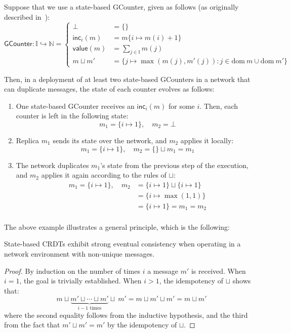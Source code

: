 \begin{example}
  Suppose that we use a state-based GCounter, given as follows (as originally
  described in~\citep{almedia18}):
  \[
    \mathsf{GCounter}
      : \mathbb{I} \hookrightarrow \mathbb{N}
      = \left\{
          \begin{aligned}
            \bot &= \{\} \\
            \mathsf{inc}_i(m) &= m\{ i \mapsto m(i) + 1 \} \\
            \mathsf{value}(m) &= \sum_{j \in \mathbb{I}} m(j) \\
            m \sqcup m' &= \{
              j \mapsto \max(m(j), m'(j)) :
              j \in \mathrm{dom}~m \cup \mathrm{dom}~m'
            \}
          \end{aligned}
        \right.
  \]

  Then, in a deployment of at least two state-based GCounters in a network that
  can duplicate messages, the state of each counter evolves as follows:
  \begin{enumerate}
    \item One state-based GCounter receives an $\mathsf{inc}_i(m)$ for some $i$.
      Then, each counter is left in the following state:
      \[
        m_1 = \{ i \mapsto 1 \},\quad
        m_2 = \bot
      \]
    \item Replica $m_1$ sends its state over the network, and $m_2$ applies it
      locally:
      \[
        m_1 = \{ i \mapsto 1 \},\quad
        m_2 = \{\} \sqcup m_1 = m_1
      \]
    \item The network duplicates $m_1$'s state from the previous step of the
      execution, and $m_2$ applies it again according to the rules of $\sqcup$:
      \[
        \begin{aligned}
          m_1 = \{ i \mapsto 1 \},\quad
          m_2
            &= \{ i \mapsto 1 \} \sqcup \{ i \mapsto 1 \} \\
            &= \{ i \mapsto \max(1, 1) \} \\
            &= \{ i \mapsto 1 \} = m_1 = m_2 \\
        \end{aligned}
      \]
  \end{enumerate}
\end{example}

The above example illustrates a general principle, which is the following:
\begin{theorem} \label{thm:state-sec-dup}
  State-based CRDTs exhibit strong eventual consistency when operating in a
  network environment with non-unique messages.
\end{theorem}
\begin{proof}
  By induction on the number of times $i$ a message $m'$ is received. When $i =
  1$, the goal is trivially established. When $i > 1$, the idempotency of
  $\sqcup$ shows that:
  \[
    m \sqcup \underbrace{m' \sqcup \cdots \sqcup m'}_{\text{$i-1$ times}} \sqcup~m'
      = m \sqcup m' \sqcup m'
      = m \sqcup m'
  \]
  where the second equality follows from the inductive hypothesis, and the third
  from the fact that $m' \sqcup m' = m'$ by the idempotency of $\sqcup$.
\end{proof}

